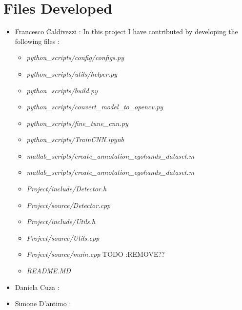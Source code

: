 \section{Files Developed}
    \begin{itemize}
        \item Francesco Caldivezzi : In this project I have contributed by developing the following files :
            \begin{itemize}
                \item \textit{python\_scripts/config/configs.py}
                \item \textit{python\_scripts/utils/helper.py}
                \item \textit{python\_scripts/build.py}
                \item \textit{python\_scripts/convert\_model\_to\_opencv.py}
                \item \textit{python\_scripts/fine\_tune\_cnn.py}
                \item \textit{python\_scripts/TrainCNN.ipynb}
                \item \textit{matlab\_scripts/create\_annotation\_egohands\_dataset.m}
                \item \textit{matlab\_scripts/create\_annotation\_egohands\_dataset.m}
                \item \textit{Project/include/Detector.h}
                \item \textit{Project/source/Detector.cpp}
                \item \textit{Project/include/Utils.h}
                \item \textit{Project/source/Utils.cpp}
                \item \textit{Project/source/main.cpp} TODO :REMOVE??
                \item \textit{README.MD}
            \end{itemize}
        \item Daniela Cuza :
        \item Simone D'antimo :
    \end{itemize}